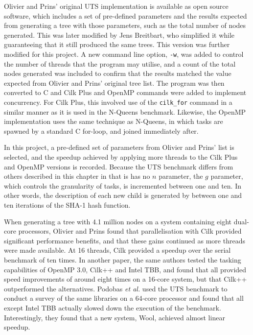 \documentclass{report}
\begin{document}
Olivier and Prins' original UTS implementation is available as open source software\cite{UtsSite}, which includes a set of pre-defined parameters and the results expected from generating a tree with those parameters, such as the total number of nodes generated. This was later modified by Jens Breitbart\cite{UtsSimpleSite}, who simplified it while guaranteeing that it still produced the same trees. This version was further modified for this project. A new command line option, \verb!-w!, was added to control the number of threads that the program may utilise, and a count of the total nodes generated was included to confirm that the results matched the value expected from Olivier and Prins' original tree list. The program was then converted to C and Cilk Plus and OpenMP commands were added to implement concurrency. For Cilk Plus, this involved use of the \verb!cilk_for! command in a similar manner as it is used in the N-Queens benchmark. Likewise, the OpenMP implementation uses the same technique as N-Queens, in which tasks are spawned by a standard C for-loop, and joined immediately after.

In this project, a pre-defined set of parameters from Olivier and Prins' list is selected, and the speedup achieved by applying more threads to the Cilk Plus and OpenMP versions is recorded. Because the UTS benchmark differs from others described in this chapter in that is has no \(n\) parameter, the \(g\) parameter, which controls the granularity of tasks, is incremented between one and ten. In other words, the description of each new child is generated by between one and ten iterations of the SHA-1 hash function.

When generating a tree with 4.1 million nodes on a system containing eight dual-core processors, Olivier and Prins\cite{Olivier09} found that parallelisation with Cilk provided significant performance benefits, and that these gains continued as more threads were made available. At 16 threads, Cilk provided a speedup over the serial benchmark of ten times. In another paper, the same authors\cite{Olivier10} tested the tasking capabilities of OpenMP 3.0, Cilk++ and Intel TBB, and found that all provided speed improvements of around eight times on a 16-core system, but that Cilk++ outperformed the alternatives. Podobas\cite{Podobas15} \textit{et al.} used the UTS benchmark to conduct a survey of the same libraries on a 64-core processor and found that all except Intel TBB actually slowed down the execution of the benchmark. Interestingly, they found that a new system, Wool, achieved almost linear speedup.
\end{document}
